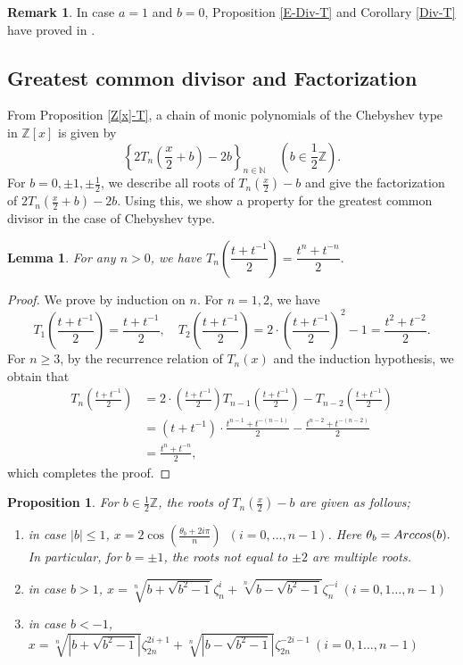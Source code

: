 \documentclass[a4paper, 11pt]{amsart}
\numberwithin{equation}{section}
\newtheorem{prop}[thm]{Proposition}
\newtheorem{lem}[thm]{Lemma}
\theoremstyle{definition}
\newtheorem{rmk}[thm]{Remark}
\newcommand{\Z}{\mathbb{Z}}
\newcommand{\N}{\mathbb{N}}
\begin{document}
\begin{rmk}
In case $a=1$ and $b=0$, Proposition \ref{E-Div-T} and Corollary \ref{Div-T} have proved in \cite{RTW}.
\end{rmk}







\subsection{Greatest common divisor and Factorization}
From Proposition \ref{Z[x]-T}, a chain of monic polynomials of the Chebyshev type in $\Z[x]$ is given by
\[
\left\{2T_n\left(\frac{x}2+b\right)-2b\right\}_{n\in \N}\quad \left(b\in \frac12\Z\right).
\]
For $b=0,\pm1, \pm\frac12$, we describe all roots of $T_n(\frac x2)-b$ and give the factorization of $2T_n\left(\frac{x}2+b\right)-2b$.
Using this, we show a property for the greatest common divisor in the case of Chebyshev type.


\begin{lem}\label{lem}
For any $n>0$, we have
$T_n\left(\dfrac{t + t^{-1}}{2}\right) = \dfrac{t^n + t^{-n}}{2}. $
\end{lem}

\begin{proof}
We prove by induction on $n$.
For $n=1,2$, we have
$$T_1\left(\frac{t + t^{-1}}{2}\right) = \frac{t + t^{-1}}{2}, \quad T_2\left(\frac{t + t^{-1}}{2}\right) = 2 \cdot \left(\frac{t + t^{-1}}{2}\right)^2 - 1 = \frac{t^2 + t^{-2}}{2}. $$
For $n \geq 3$, by the recurrence relation of $T_n(x)$ and the induction hypothesis, we obtain that
\begin{align*}
T_n\left(\frac{t + t^{-1}}{2}\right) &= 2 \cdot \left(\frac{t + t^{-1}}{2}\right) T_{n-1}\left(\frac{t + t^{-1}}{2}\right) - T_{n-2}\left(\frac{t + t^{-1}}{2}\right) \\
& = (t + t^{-1}) \cdot \frac{t^{n-1} + t^{-(n-1)}}{2} - \frac{t^{n-2} + t^{-(n-2)}}{2} \\
& = \frac{t^{n} + t^{-n}}{2}, 
\end{align*}
which completes the proof.
\end{proof}

\begin{prop}\label{root-T}
For $b\in \frac12\Z$, the roots of $T_n(\frac x2) - b$ are given as follows;
\begin{enumerate}[{\rm (1)}]
\item
in case $|b|\leq 1$, $x=2\cos(\frac{\theta_b+2i\pi}n)$\ $(i=0,\dots,n-1)$. Here $\theta_b={\rm Arccos}(b).$
In particular, for $b=\pm 1$, the roots not equal to $\pm 2$ are multiple roots.\medskip

\item
in case $b>1$, $x=\sqrt[n]{b + \sqrt{b^2 -1 }}\zeta_n^i + \sqrt[n]{b - \sqrt{b^2 -1 }}\zeta_n^{-i}\ (i=0,1\dots,n-1)$\medskip
\item
in case $b<-1$, $x=\sqrt[n]{|b + \sqrt{b^2 -1}|}\zeta_{2n}^{2i+1} + \sqrt[n]{|b - \sqrt{b^2 -1}|}\zeta_{2n}^{-2i-1}\ (i=0,1\dots,n-1)$\end{enumerate}
\end{prop}
\end{document}
